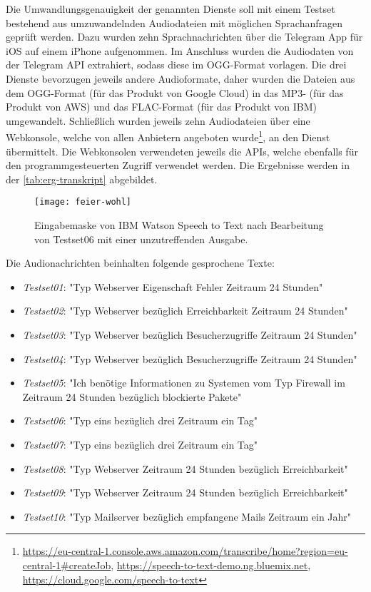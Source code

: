 Die Umwandlungsgenauigkeit der genannten Dienste soll mit einem Testset bestehend aus umzuwandelnden Audiodateien mit möglichen Sprachanfragen geprüft werden. Dazu wurden zehn Sprachnachrichten über die Telegram App für iOS auf einem iPhone aufgenommen. Im Anschluss wurden die Audiodaten von der Telegram API extrahiert, sodass diese im OGG-Format vorlagen. Die drei Dienste bevorzugen jeweils andere Audioformate, daher wurden die Dateien aus dem OGG-Format (für das Produkt von Google Cloud) in das MP3- (für das Produkt von AWS) und das FLAC-Format (für das Produkt von IBM) umgewandelt. Schließlich wurden jeweils zehn Audiodateien über eine Webkonsole, welche von allen Anbietern angeboten wurde\footnote{\url{https://eu-central-1.console.aws.amazon.com/transcribe/home?region=eu-central-1\#createJob}, \url{https://speech-to-text-demo.ng.bluemix.net}, \url{https://cloud.google.com/speech-to-text}}, an den Dienst übermittelt. Die Webkonsolen verwendeten jeweils die APIs, welche ebenfalls für den programmgesteuerten Zugriff verwendet werden. Die Ergebnisse werden in der \autoref{tab:erg-transkript} abgebildet.

\begin{figure}[h!]
\centering
\texttt{[image: feier-wohl]}
\caption{Eingabemaske von IBM Watson Speech to Text nach Bearbeitung von Testset06 mit einer unzutreffenden Ausgabe.}
\label{fig:feier-wohl}
\end{figure}

Die Audionachrichten beinhalten folgende gesprochene Texte:
\begin{itemize}
\item \textit{Testset01}: "Typ Webserver Eigenschaft Fehler Zeitraum 24 Stunden"
\item \textit{Testset02}: "Typ Webserver bezüglich Erreichbarkeit Zeitraum 24 Stunden"
\item \textit{Testset03}: "Typ Webserver bezüglich Besucherzugriffe Zeitraum 24 Stunden"
\item \textit{Testset04}: "Typ Webserver bezüglich Besucherzugriffe Zeitraum 24 Stunden"
\item \textit{Testset05}: "Ich benötige Informationen zu Systemen vom Typ Firewall im Zeitraum 24 Stunden bezüglich blockierte Pakete"
\item \textit{Testset06}: "Typ eins bezüglich drei Zeitraum ein Tag"
\item \textit{Testset07}: "Typ eins bezüglich drei Zeitraum ein Tag"
\item \textit{Testset08}: "Typ Webserver Zeitraum 24 Stunden bezüglich Erreichbarkeit"
\item \textit{Testset09}: "Typ Webserver Zeitraum 24 Stunden bezüglich Erreichbarkeit"
\item \textit{Testset10}: "Typ Mailserver bezüglich empfangene Mails Zeitraum ein Jahr"
\end{itemize}


